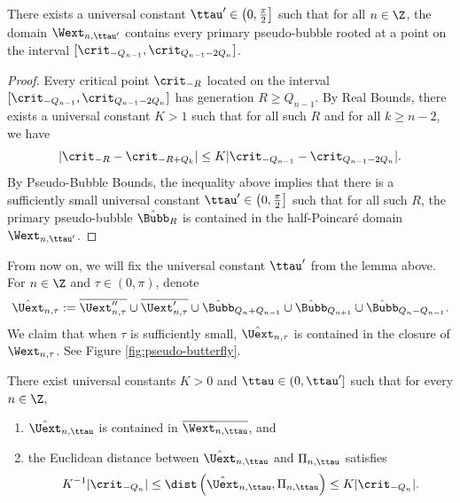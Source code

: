 \documentclass{amsart}
\begin{document}
\begin{lemma}
\label{lem:W-contains-bubbles}
    There exists a universal constant $\ttau' \in \left( 0, \frac{\pi}{2} \right]$ such that for all $n \in \Z$, the domain $\Wext_{n,\ttau'}$ contains every primary pseudo-bubble rooted at a point on the interval $[\crit_{-Q_{n-1}}, \crit_{Q_{n-1}-2Q_{n}}]$.
\end{lemma}

\begin{proof}
    Every critical point $\crit_{-R}$ located on the interval $[\crit_{-Q_{n-1}}, \crit_{Q_{n-1}-2Q_{n}}]$ has generation $R \geq Q_{n-1}$.
    By Real Bounds, there exists a universal constant $K>1$ such that for all such $R$ and for all $k \geq n-2$, we have 
    \[
    |\crit_{-R}-\crit_{-R+Q_k}| \leq K |\crit_{-Q_{n-1}} - \crit_{Q_{n-1}-2Q_{n}}|.
    \]
    By Pseudo-Bubble Bounds, the inequality above implies that there is a sufficiently small universal constant $\ttau' \in \left( 0,\frac{\pi}{2} \right]$ such that for all such $R$, the primary pseudo-bubble $\hat{\Bubb}_R$ is contained in the half-Poincar\'e domain $\Wext_{n,\ttau'}$.  
\end{proof}

From now on, we will fix the universal constant $\ttau'$ from the lemma above.
For $n \in \Z$ and $\tau \in (0 ,\pi)$, denote
    \[
        \hat{\Uext}_{n,\tau} := \overline{ \Uext''_{n,\tau} } \cup \overline{ \Uext'_{n,\tau} } \cup \hat{\Bubb}_{Q_n+Q_{n-1}} \cup \hat{\Bubb}_{Q_{n+1}} \cup \hat{\Bubb}_{Q_n-Q_{n-1}}.
    \]
We claim that when $\tau$ is sufficiently small, $\hat{\Uext}_{n,\tau}$ is contained in the closure of $\Wext_{n,\tau}$. 
See Figure \ref{fig:pseudo-butterfly}.
    
\begin{proposition}
\label{prop:butterflies}
    There exist universal constants $K>0$ and $\ttau \in ( 0, \ttau']$ such that for every $n \in \Z$,
    \begin{enumerate}
        \item $\hat{\Uext}_{n,\ttau}$ is contained in $\overline{\Wext_{n, \ttau}}$, and
        \item the Euclidean distance between $\hat{\Uext}_{n, \ttau}$ and $\Pi_{n,\ttau}$ satisfies 
    \[
         K^{-1} |\crit_{-Q_n}| \leq \dist \left( \hat{\Uext}_{n, \ttau}, \Pi_{n,\ttau} \right) \leq K |\crit_{-Q_n}|.
    \]
    \end{enumerate}
\end{proposition}
\end{document}

